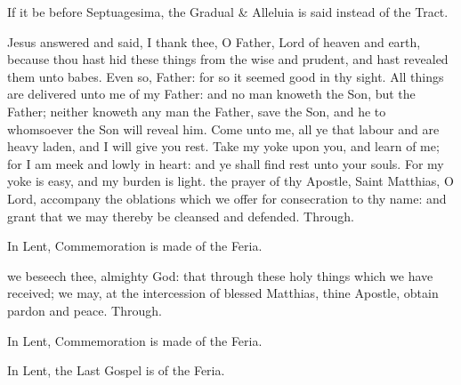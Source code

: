 
\begin{rubric}
    If it be before Septuagesima, the Gradual \& Alleluia is said instead of the Tract.
\end{rubric}


 Jesus answered and said, I thank thee, O Father, Lord of heaven and earth, because thou hast hid these things from the wise and prudent, and hast revealed them unto babes. Even so, Father: for so it seemed good in thy sight. All things are delivered unto me of my Father: and no man knoweth the Son, but the Father; neither knoweth any man the Father, save the Son, and he to whomsoever the Son will reveal him. Come unto me, all ye that labour and are heavy laden, and I will give you rest. Take my yoke upon you, and learn of me; for I am meek and lowly in heart: and ye shall find rest unto your souls. For my yoke is easy, and my burden is light.
\secret
{} the prayer of thy Apostle, Saint Matthias, O Lord, accompany the oblations which we offer for consecration to thy name: and grant that we may thereby be cleansed and defended. Through.
\begin{rubric}
    In Lent, Commemoration is made of the Feria.%
\end{rubric}
\postcommunion
{} we beseech thee, almighty God: that through these holy things which we have received; we may, at the intercession of blessed Matthias, thine Apostle, obtain pardon and peace. Through.
\begin{rubric}
    In Lent, Commemoration is made of the Feria.%
\end{rubric}
\begin{rubric}
    In Lent, the Last Gospel is of the Feria.
\end{rubric}

